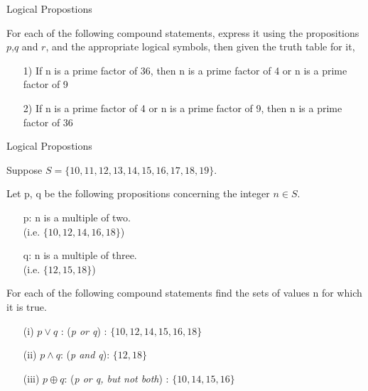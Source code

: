 \documentclass[12pt]{article}
\begin{document}


{Logical Propostions}

For each of the following compound statements, express it using the propositions $p$,$q$ and $r$, and the appropriate logical symbols, then given the truth table for it,

\begin{itemize}
\item[1)] If n is a prime factor of 36, then n is a prime factor of 4 or n is a prime factor of 9
\item[2)] If n is a prime factor of 4 or n is a prime factor of 9, then  n is a prime factor of 36
\end{itemize}


{Logical Propostions}

Suppose $S = \{10,11,12,13,14,15,16,17,18,19\}$.

Let p, q be the following propositions concerning the integer $n \in S$.
\begin{itemize}
\item[p:] n is a multiple of two. \\(i.e. $\{10,12,14,16,18\}$)
\item[q:] n is a multiple of three. \\(i.e. $\{12,15,18\}$)
\end{itemize}

For each of the following compound statements find the sets of values n for which it is true. 

\begin{itemize}
\item[(i)] $p \vee q$ : (\textit{p or q}) :  $\{10, 12, 14, 15, 16, 18\}$ 
\item[(ii)] $p \wedge q$: (\textit{p and q}):  $\{12, 18\}$
\item[(iii)] $ p \oplus q$: (\textit{p or q, but not both}) :  $\{10, 14, 15, 16\}$
\end{itemize}
\end{document}
